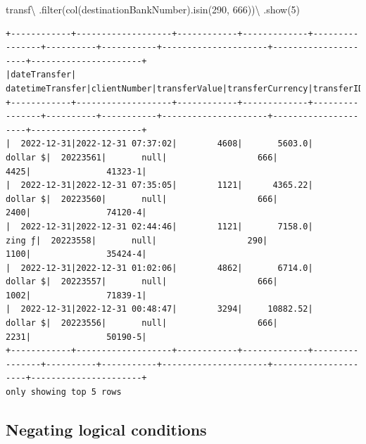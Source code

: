 \documentclass[
  11pt,
  letterpaper,
  DIV=11,
  numbers=noendperiod]{scrreprt}
\newenvironment{Shaded}{\begin{snugshade}}{\end{snugshade}}
\newcommand{\BuiltInTok}[1]{\textcolor[rgb]{0.00,0.23,0.31}{#1}}
\newcommand{\DecValTok}[1]{\textcolor[rgb]{0.68,0.00,0.00}{#1}}
\newcommand{\NormalTok}[1]{\textcolor[rgb]{0.00,0.23,0.31}{#1}}
\newcommand{\OperatorTok}[1]{\textcolor[rgb]{0.37,0.37,0.37}{#1}}
\newcommand{\StringTok}[1]{\textcolor[rgb]{0.13,0.47,0.30}{#1}}
\begin{document}
\begin{Shaded}
\begin{Highlighting}[]
\NormalTok{transf}\OperatorTok{\textbackslash{}}
\NormalTok{  .}\BuiltInTok{filter}\NormalTok{(col(}\StringTok{\textquotesingle{}destinationBankNumber\textquotesingle{}}\NormalTok{).isin(}\DecValTok{290}\NormalTok{, }\DecValTok{666}\NormalTok{))}\OperatorTok{\textbackslash{}}
\NormalTok{  .show(}\DecValTok{5}\NormalTok{)}
\end{Highlighting}
\end{Shaded}

\begin{verbatim}
+------------+-------------------+------------+-------------+----------------+----------+-----------+---------------------+---------------------+----------------------+
|dateTransfer|   datetimeTransfer|clientNumber|transferValue|transferCurrency|transferID|transferLog|destinationBankNumber|destinationBankBranch|destinationBankAccount|
+------------+-------------------+------------+-------------+----------------+----------+-----------+---------------------+---------------------+----------------------+
|  2022-12-31|2022-12-31 07:37:02|        4608|       5603.0|        dollar $|  20223561|       null|                  666|                 4425|               41323-1|
|  2022-12-31|2022-12-31 07:35:05|        1121|      4365.22|        dollar $|  20223560|       null|                  666|                 2400|               74120-4|
|  2022-12-31|2022-12-31 02:44:46|        1121|       7158.0|          zing ƒ|  20223558|       null|                  290|                 1100|               35424-4|
|  2022-12-31|2022-12-31 01:02:06|        4862|       6714.0|        dollar $|  20223557|       null|                  666|                 1002|               71839-1|
|  2022-12-31|2022-12-31 00:48:47|        3294|     10882.52|        dollar $|  20223556|       null|                  666|                 2231|               50190-5|
+------------+-------------------+------------+-------------+----------------+----------+-----------+---------------------+---------------------+----------------------+
only showing top 5 rows
\end{verbatim}

\hypertarget{negating-logical-conditions}{%
\subsection{Negating logical
conditions}\label{negating-logical-conditions}}
\end{document}
